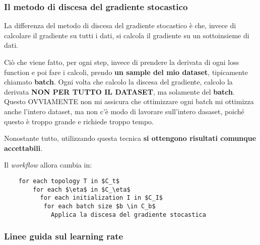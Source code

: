 \subsubsection{Il metodo di discesa del gradiente stocastico}
La differenza del metodo di discesa del gradiente stocastico è che, invece di
calcolare il gradiente su tutti i dati, si calcola il gradiente su un
sottoinsieme di dati.

Ciò che viene fatto, per ogni step, invece di prendere la derivata di ogni loss
function e poi fare i calcoli, prendo \textbf{un sample del mio dataset},
tipicamente chiamato \textbf{batch}. Ogni volta che calcolo la discesa del
gradiente, calcolo la derivata \textbf{NON PER TUTTO IL DATASET}, ma solamente
del \textbf{batch}. Questo OVVIAMENTE non mi assicura che ottimizzare ogni
batch mi ottimizza anche l'intero dataset, ma non c'è modo di lavorare
sull'intero dasaset, poiché questo è troppo grande e richiede troppo tempo.

Nonostante tutto, utilizzando questa tecnica \textbf{si ottengono risultati
    comunque accettabili}.

Il \textit{workflow} allora cambia in: \lstset{mathescape}
\begin{lstlisting}
    for each topology T in $C_t$
        for each $\eta$ in $C_\eta$
          for each initialization I in $C_I$
           for each batch size $b \in C_b$
             Applica la discesa del gradiente stocastica
\end{lstlisting}

\subsubsection{Linee guida sul learning rate}

